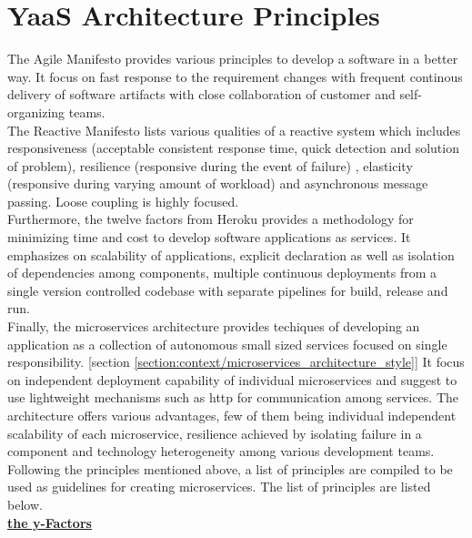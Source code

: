 \section{YaaS Architecture Principles}\label{section:hybris_architecture/YaaS_architecture_principles}
The Agile Manifesto \cite{Beck:2011aa} provides various principles to develop a software in a better way. It focus on fast response to the requirement changes with frequent continous delivery of software artifacts with close collaboration of customer and self-organizing teams.\\
The Reactive Manifesto \cite{Boner:2014aa} lists various qualities of a reactive system which includes responsiveness (acceptable consistent response time, quick detection and solution of problem), resilience (responsive during the event of failure) , elasticity (responsive during varying amount of workload) and asynchronous message passing. Loose coupling is highly focused.\\
Furthermore, the twelve factors from Heroku \cite{Wiggins:2012aa} provides a methodology for minimizing time and cost to develop software applications as services. It emphasizes on scalability of applications, explicit declaration as well as isolation of dependencies among components, multiple continuous deployments from a single version controlled codebase with separate pipelines for build, release and run.\\
Finally, the microservices architecture provides techiques of developing an application as a collection of autonomous small sized services focused on single responsibility. [section \ref{section:context/microservices_architecture_style}] It focus on independent deployment capability of individual microservices and suggest to use lightweight mechanisms such as http for communication among services. The architecture offers various advantages, few of them being individual independent scalability of each microservice, resilience achieved by isolating failure in a component and technology heterogeneity among various development teams.\cite{Newman:2015aa}
\\
Following the principles mentioned above, a list of principles are compiled to be used as guidelines for creating microservices. \cite{Stubbe:2015aa} The list of principles are listed below.
\\
\textbf{\underline{the y-Factors}}
\\
